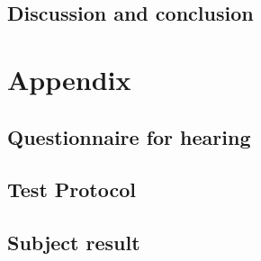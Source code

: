 \chapter{Discussion and conclusion}




 




\glsresetall
\appendix %

 \graphicspath{{figures/appendix/}}
\part{Appendix}\label{pt:appendix}











\chapter{Questionnaire for hearing}\label{apend:quest_for_hearing}


\chapter{Test Protocol}\label{apend:test_protocol}




\chapter{Subject result}\label{apend:subject_result}










